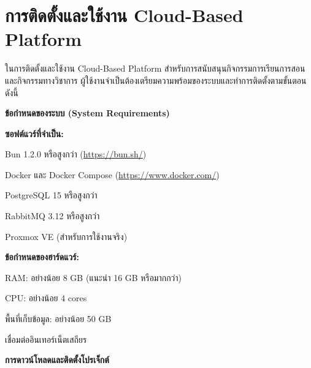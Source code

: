 \section{การติดตั้งและใช้งาน Cloud-Based Platform}
\hspace*{1.5em}
ในการติดตั้งและใช้งาน Cloud-Based Platform สำหรับการสนับสนุนกิจกรรมการเรียนการสอนและกิจกรรมทางวิชาการ ผู้ใช้งานจำเป็นต้องเตรียมความพร้อมของระบบและทำการติดตั้งตามขั้นตอนดังนี้

\vspace{0.5em}
\textbf{ข้อกำหนดของระบบ (System Requirements)}
\vspace{0.5em}

\begin{mycustomenum2}
    \item \textbf{ซอฟต์แวร์ที่จำเป็น:}
    \begin{mycustomenum2}
        \item Bun 1.2.0 หรือสูงกว่า (\href{https://bun.sh/}{https://bun.sh/})
        \item Docker และ Docker Compose (\href{https://www.docker.com/}{https://www.docker.com/})
        \item PostgreSQL 15 หรือสูงกว่า
        \item RabbitMQ 3.12 หรือสูงกว่า
        \item Proxmox VE (สำหรับการใช้งานจริง)
    \end{mycustomenum2}

    \item \textbf{ข้อกำหนดของฮาร์ดแวร์:}
    \begin{mycustomenum2}
        \item RAM: อย่างน้อย 8 GB (แนะนำ 16 GB หรือมากกว่า)
        \item CPU: อย่างน้อย 4 cores
        \item พื้นที่เก็บข้อมูล: อย่างน้อย 50 GB
        \item เชื่อมต่ออินเทอร์เน็ตเสถียร
    \end{mycustomenum2}
\end{mycustomenum2}

\vspace{0.5em}
\textbf{การดาวน์โหลดและติดตั้งโปรเจ็กต์}
\vspace{0.5em}

